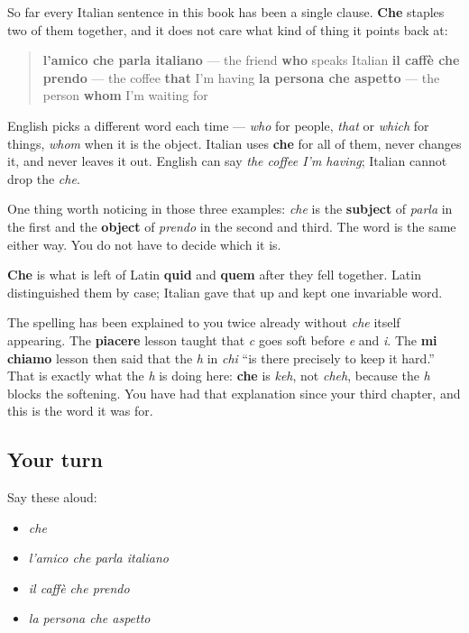 So far every Italian sentence in this book has been a single clause. \textbf{Che} staples two of them together, and it does not care what kind of thing it points back at:

\begin{quote}
\textbf{l'amico che parla italiano} — the friend \textbf{who} speaks Italian \textbf{il caffè che prendo} — the coffee \textbf{that} I'm having \textbf{la persona che aspetto} — the person \textbf{whom} I'm waiting for
\end{quote}

English picks a different word each time — \emph{who} for people, \emph{that} or \emph{which} for things, \emph{whom} when it is the object. Italian uses \textbf{che} for all of them, never changes it, and never leaves it out. English can say \emph{the coffee I'm having}; Italian cannot drop the \emph{che}.

One thing worth noticing in those three examples: \emph{che} is the \textbf{subject} of \emph{parla} in the first and the \textbf{object} of \emph{prendo} in the second and third. The word is the same either way. You do not have to decide which it is.

\begin{cousinweb}
\textbf{Che} is what is left of Latin \textbf{quid} and \textbf{quem} after they fell together. Latin distinguished them by case; Italian gave that up and kept one invariable word.

The spelling has been explained to you twice already without \emph{che} itself appearing. The \textbf{piacere} lesson taught that \emph{c} goes soft before \emph{e} and \emph{i}. The \textbf{mi chiamo} lesson then said that the \emph{h} in \emph{chi} \textquotedblleft{}is there precisely to keep it hard.\textquotedblright{} That is exactly what the \emph{h} is doing here: \textbf{che} is \emph{keh}, not \emph{cheh}, because the \emph{h} blocks the softening. You have had that explanation since your third chapter, and this is the word it was for.
\end{cousinweb}

\subsection*{Your turn}
Say these aloud:

\begin{itemize}
\raggedright
  \item \emph{che}
  \item \emph{l'amico che parla italiano}
  \item \emph{il caffè che prendo}
  \item \emph{la persona che aspetto}
\end{itemize}

